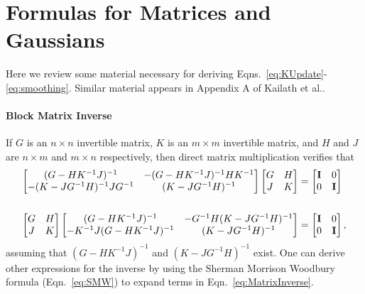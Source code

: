 \appendix

\chapter{Formulas for Matrices and Gaussians}
\label{cha:MatrixFormulas}

Here we review some material necessary for deriving
Eqns.~\eqref{eq:KUpdate}-\eqref{eq:smoothing}.  Similar material
appears in Appendix A of Kailath et al.\cite{KSH00}.

\subsubsection{Block Matrix Inverse}
%
%

If $G$ is an $n\times n$ invertible matrix, $K$ is an $m\times m$
invertible matrix, and $H$ and $J$ are $n\times m$ and $m\times n$
respectively, then direct matrix multiplication verifies that
\begin{subequations}
  \label{eq:MatrixInverse}
  \begin{align}
    \begin{bmatrix}
      (G-HK^{-1}J)^{-1} & -(G-HK^{-1}J)^{-1}HK^{-1} \\
      -(K-JG^{-1}H)^{-1}JG^{-1} & (K-JG^{-1}H)^{-1}
    \end{bmatrix}
    \begin{bmatrix}
      G & H \\ J & K
    \end{bmatrix}
    &=
    \begin{bmatrix}
      {\bf I} & 0 \\ 0 & {\bf I}
    \end{bmatrix}\\ \nonumber \\
    \begin{bmatrix}
      G & H \\ J & K
    \end{bmatrix}
    \begin{bmatrix}
      (G-HK^{-1}J)^{-1} & -G^{-1}H(K-JG^{-1}H)^{-1} \\
      -K^{-1}J(G-HK^{-1}J)^{-1} & (K-JG^{-1}H)^{-1}
    \end{bmatrix}
    &=
    \begin{bmatrix}
      {\bf I} & 0 \\ 0 & {\bf I}
    \end{bmatrix},
  \end{align}
\end{subequations}
assuming that $(G-HK^{-1}J)^{-1}$ and $(K-JG^{-1}H)^{-1}$ exist.
One can derive other expressions for the inverse by using the Sherman
Morrison Woodbury formula (Eqn.~\eqref{eq:SMW}) to expand terms in
Eqn.~\eqref{eq:MatrixInverse}.

